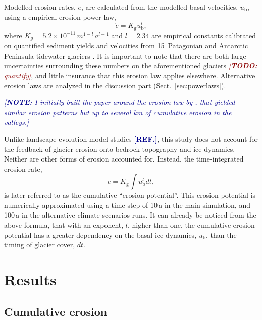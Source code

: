 \documentclass[utf8]{article}
\newcommand{\note}[1]{\textcolor{darkblue}{\emph{[\textbf{NOTE:} #1]}}}
\newcommand{\todo}[1]{\textcolor{darkred}{\emph{[\textbf{TODO:} #1]}}}
\newcommand{\aref}[0]{\textcolor{darkblue}{\textbf{[REF.]}}}
\begin{document}
    Modelled erosion rates, $\dot{e}$, are calculated from the modelled basal
    velocities, $u_\mathrm{b}$, using a empirical erosion power-law,
    \begin{equation}
        \dot{e} = K_\mathrm{g} u_\mathrm{b}^l ,
    \end{equation}
    where $K_g = 5.2\times 10^{-11}\,m^{1-l}\,a^{l-1}$ and $l = 2.34$ are
    empirical constants calibrated on quantified sediment yields and velocities
    from 15~Patagonian and Antarctic Peninsula tidewater glaciers
    \citep{Koppes.etal.2015}. It is important to note that there are both large
    uncertainties surrounding these numbers on the aforementioned glaciers
    \todo{quantify}, and little insurance that this erosion law applies
    elsewhere. Alternative erosion laws are analyzed in the discussion part
    (Sect.~\ref{sec:powerlaws}).

    \note{I initially built the paper around the erosion law by
          \citep{Herman.etal.2015}, that yielded similar erosion patterns but
          up to several km of cumulative erosion in the valleys.}

    Unlike landscape evolution model studies \aref, this study does not account
    for the feedback of glacier erosion onto bedrock topography and ice dynamics.
    Neither are other forms of erosion accounted for. Instead, the
    time-integrated erosion rate,
    \begin{equation}
        e =  K_\mathrm{g} \int u_\mathrm{b}^l dt,
    \end{equation}
    is later referred to as the cumulative ``erosion potential''. This erosion
    potential is numerically approximated using a time-step of 10\,a in the
    main simulation, and 100\,a in the alternative climate scenarios runs. It
    can already be noticed from the above formula, that with an exponent, $l$,
    higher than one, the cumulative erosion potential has a greater dependency
    on the basal ice dynamics, $u_\mathrm{b}$, than the timing of glacier
    cover, $dt$.


\section{Results}

\subsection{Cumulative erosion}
\end{document}
